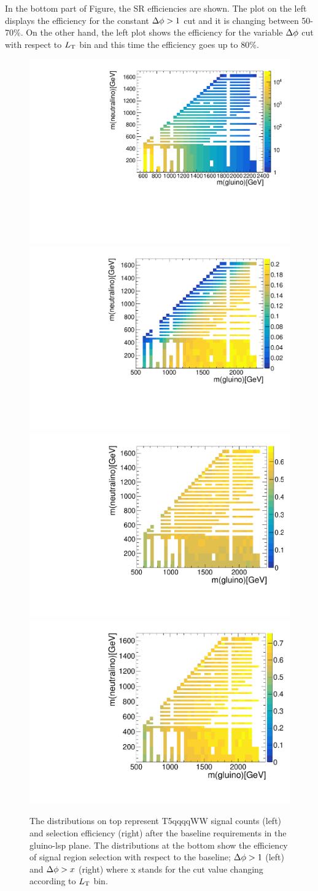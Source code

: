 In the bottom part of Figure, the SR efficiencies are shown. The plot on the left displays the efficiency for the constant $\Delta \phi>1$ cut and it is changing between 50-70\%. On the other hand, the left plot shows the efficiency for the variable $\Delta \phi$ cut with respect to $L_{\rm T}$ bin and this time the efficiency goes up to 80\%. 
\begin{figure}[!hbt]
    \begin{center}
 \includegraphics[width=0.45 \textwidth]{Plots/analysis/signalRegions/preselyields}
 \includegraphics[width=0.4 \textwidth]{Plots/analysis/signalRegions/preselEff}\\
 \includegraphics[width=0.4 \textwidth]{Plots/analysis/signalRegions/DF_Eff}
  \includegraphics[width=0.4 \textwidth]{Plots/analysis/signalRegions/DF_var_Eff}
  \caption{ \label{fig:signalEffs} The distributions on top represent T5qqqqWW signal counts (left) and selection efficiency (right) after the baseline requirements in the gluino-lsp plane. The distributions at the bottom show the efficiency of signal region selection with respect to the baseline; $\Delta \phi>1$ (left) and $\Delta \phi>x$ (right) where x stands for the cut value changing according to $L_{\rm T}$ bin.  
  }
   \end{center}
\end{figure}
